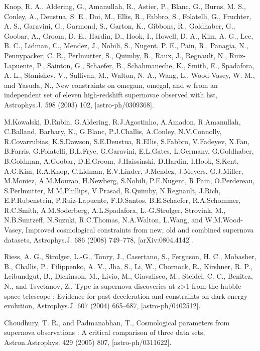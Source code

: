 \documentclass[a4paper,12pt]{report}
\theoremstyle{plain}
\theoremstyle{plain}
\begin{document}
\begin{thebibliography}{90}
 Knop, R. A., Aldering, G., Amanullah, R., Astier, P., Blanc, G., Burns, M. S., Conley,
A., Deustua, S. E., Doi, M., Ellis, R., Fabbro, S., Folatelli, G., Fruchter, A. S.,
Garavini, G., Garmond, S., Garton, K., Gibbons, R., Goldhaber, G., Goobar, A.,
Groom, D. E., Hardin, D., Hook, I., Howell, D. A., Kim, A. G., Lee, B. C., Lidman,
C., Mendez, J., Nobili, S., Nugent, P. E., Pain, R., Panagia, N., Pennypacker, C. R.,
Perlmutter, S., Quimby, R., Raux, J., Regnault, N., Ruiz-Lapuente, P., Sainton, G.,
Schaefer, B., Schahmaneche, K., Smith, E., Spadafora, A. L., Stanishev, V., Sullivan,
M., Walton, N. A., Wang, L., Wood-Vasey, W. M., and Yasuda, N., New constraints
on omegam, omegal, and w from an independent set of eleven high-redshift supernovae
observed with hst, Astrophys.J. 598 (2003) 102, [astro-ph/0309368].

 M.Kowalski, D.Rubin, G.Aldering, R.J.Agostinho, A.Amadon, R.Amanullah,
C.Balland, Barbary, K., G.Blanc, P.J.Challis, A.Conley, N.V.Connolly,
R.Covarrubias, K.S.Dawson, S.E.Deustua, R.Ellis, S.Fabbro, V.Fadeyev,
X.Fan, B.Farris, G.Folatelli, B.L.Frye, G.Garavini, E.L.Gates, L.Germany,
G.Goldhaber, B.Goldman, A.Goobar, D.E.Groom, J.Haissinski, D.Hardin,
I.Hook, S.Kent, A.G.Kim, R.A.Knop, C.Lidman, E.V.Linder, J.Mendez, J.Meyers,
G.J.Miller, M.Moniez, A.M.Mourao, H.Newberg, S.Nobili, P.E.Nugent, R.Pain,
O.Perdereau, S.Perlmutter, M.M.Phillips, V.Prasad, R.Quimby, N.Regnault, J.Rich,
E.P.Rubenstein, P.Ruiz-Lapuente, F.D.Santos, B.E.Schaefer, R.A.Schommer,
R.C.Smith, A.M.Soderberg, A.L.Spadafora, L.-G.Strolger, Strovink, M.,
N.B.Suntzeff, N.Suzuki, R.C.Thomas, N.A.Walton, L.Wang, and W.M.Wood-
Vasey, Improved cosmological constraints from new, old and combined supernova
datasets, Astrophys.J. 686 (2008) 749–778, [arXiv:0804.4142].

 Riess, A. G., Strolger, L.-G., Tonry, J., Casertano, S., Ferguson, H. C., Mobasher,
B., Challis, P., Filippenko, A. V., Jha, S., Li, W., Chornock, R., Kirshner, R. P.,
Leibundgut, B., Dickinson, M., Livio, M., Giavalisco, M., Steidel, C. C., Benitez,
N., and Tsvetanov, Z., Type ia supernova discoveries at z>1 from the hubble space
telescope : Evidence for past deceleration and constraints on dark energy evolution,
Astrophys.J. 607 (2004) 665–687, [astro-ph/0402512].

 Choudhury, T. R., and Padmanabhan, T., Cosmological parameters from supernova
observations : A critical comparison of three data sets, Astron.Astrophys. 429 (2005)
807, [astro-ph/0311622].


\end{thebibliography}
\end{document}
